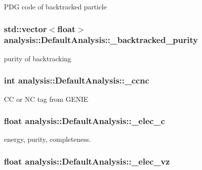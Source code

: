 P\-D\-G code of backtracked particle \hypertarget{classanalysis_1_1DefaultAnalysis_ad08d9b30c434685e350c5f292d4df08b}{
\subsubsection[{\-\_\-backtracked\-\_\-purity}]{\setlength{\rightskip}{0pt plus 5cm}std\-::vector$<$float$>$ analysis\-::\-Default\-Analysis\-::\-\_\-backtracked\-\_\-purity\hspace{0.3cm}{\ttfamily [private]}}}\label{classanalysis_1_1DefaultAnalysis_ad08d9b30c434685e350c5f292d4df08b}
purity of backtracking \hypertarget{classanalysis_1_1DefaultAnalysis_ac2df5c78c8d06e090d0b6cd195fa83d8}{
\subsubsection[{\-\_\-ccnc}]{\setlength{\rightskip}{0pt plus 5cm}int analysis\-::\-Default\-Analysis\-::\-\_\-ccnc\hspace{0.3cm}{\ttfamily [private]}}}\label{classanalysis_1_1DefaultAnalysis_ac2df5c78c8d06e090d0b6cd195fa83d8}
C\-C or N\-C tag from G\-E\-N\-I\-E \hypertarget{classanalysis_1_1DefaultAnalysis_a5ce51cfe745fbf0327541a1877a99f87}{
\subsubsection[{\-\_\-elec\-\_\-c}]{\setlength{\rightskip}{0pt plus 5cm}float analysis\-::\-Default\-Analysis\-::\-\_\-elec\-\_\-c\hspace{0.3cm}{\ttfamily [private]}}}\label{classanalysis_1_1DefaultAnalysis_a5ce51cfe745fbf0327541a1877a99f87}
energy, purity, completeness. \hypertarget{classanalysis_1_1DefaultAnalysis_ad728b8375e4d62c128d767fcebbab1d9}{
\subsubsection[{\-\_\-elec\-\_\-vz}]{\setlength{\rightskip}{0pt plus 5cm}float analysis\-::\-Default\-Analysis\-::\-\_\-elec\-\_\-vz\hspace{0.3cm}{\ttfamily [private]}}}\label{classanalysis_1_1DefaultAnalysis_ad728b8375e4d62c128d767fcebbab1d9}

